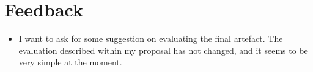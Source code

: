 \section*{Feedback}\label{S:feedback} 


\begin{itemize}
    \item I want to ask for some suggestion on evaluating the final artefact. The evaluation described within my proposal has not changed, and it seems to be very simple at the moment.   
\end{itemize}